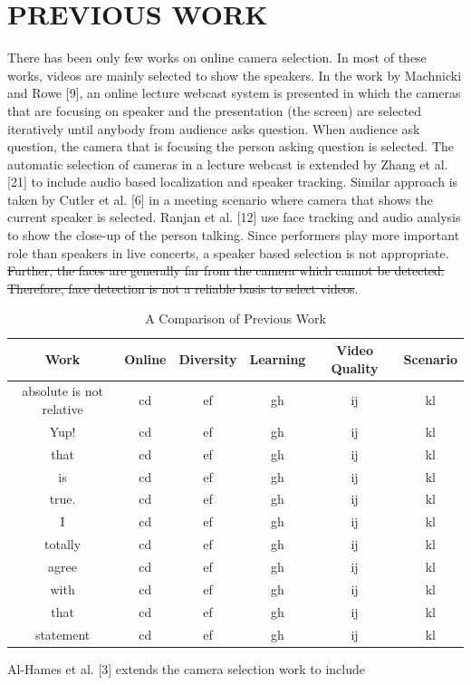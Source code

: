 \documentclass{sig-alternate-05-2015}
\providecommand{\DIFadd}[1]{{\protect\color{blue}\uwave{#1}}} %
\providecommand{\DIFdel}[1]{{\protect\color{red}\sout{#1}}}                      %
\providecommand{\DIFaddbegin}{} %
\providecommand{\DIFaddend}{} %
\providecommand{\DIFdelbegin}{} %
\providecommand{\DIFdelend}{} %
\begin{document}
\section{PREVIOUS WORK}
There has been only few works on online camera selection. In
most of these works, videos are mainly selected to show the speakers.
In the work by Machnicki and Rowe [9], an online lecture
webcast system is presented in which the cameras that are focusing
on speaker and the presentation (the screen) are selected iteratively
until anybody from audience asks question. When audience ask
question, the camera that is focusing the person asking question is
selected. The automatic selection of cameras in a lecture webcast
is extended by Zhang et al. [21] to include audio based localization
and speaker tracking. Similar approach is taken by Cutler et al. [6]
in a meeting scenario where camera that shows the current speaker
is selected. Ranjan et al. [12] use face tracking and audio analysis
to show the close-up of the person talking. Since performers
play more important role than speakers in live concerts, a speaker
based selection is not appropriate. \DIFdelbegin \DIFdel{Further, the faces are generally
far from the camera which cannot be detected. Therefore, face detection
is not a reliable basis to select videos}\DIFdelend \DIFaddbegin \DIFadd{Saaahil}\DIFaddend .\par
\begin{table}
\centering
\caption{A Comparison of Previous Work}
\begin{tabular}{|c|c|c|c|c|c} \hline
Work&Online&Diversity&Learning&Video Quality&Scenario\\ \hline
absolute is not relative&cd&ef&gh&ij&kl\\ \hline
Yup!&cd&ef&gh&ij&kl\\ \hline
that&cd&ef&gh&ij&kl\\ \hline
is&cd&ef&gh&ij&kl\\ \hline
true.&cd&ef&gh&ij&kl\\ \hline
I&cd&ef&gh&ij&kl\\ \hline
totally&cd&ef&gh&ij&kl\\ \hline
agree&cd&ef&gh&ij&kl\\ \hline
with&cd&ef&gh&ij&kl\\ \hline
that&cd&ef&gh&ij&kl\\ \hline
statement&cd&ef&gh&ij&kl\\ \hline
\end{tabular}
\end{table}
Al-Hames et al. [3] extends the camera selection work to include
\end{document}
